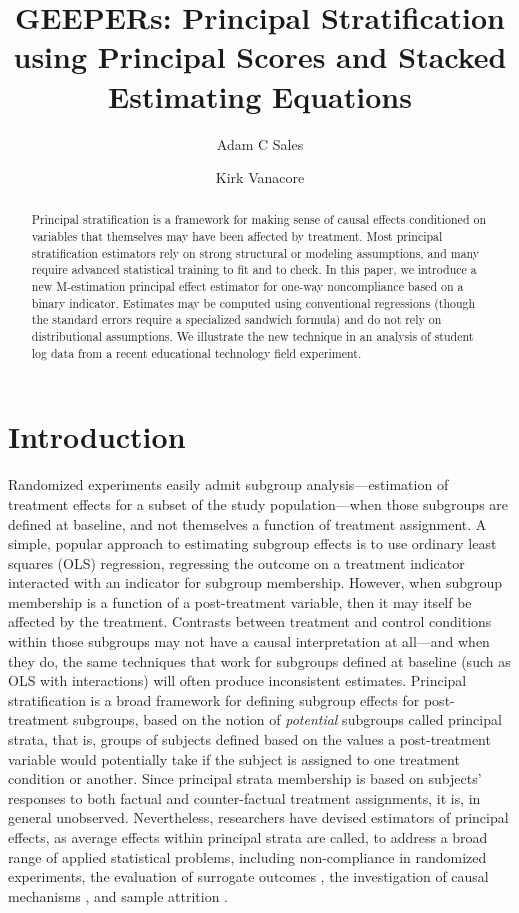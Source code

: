 \documentclass{statsoc} %
\title[GEEPERS]{GEEPERs: Principal Stratification using Principal Scores and Stacked Estimating Equations}
\author[Sales and Vanacore]{Adam C Sales}
\author{Kirk Vanacore}
\begin{document}
\maketitle

\begin{abstract}
Principal stratification is a framework for making sense of causal effects conditioned on variables that themselves may have been affected by treatment. Most principal stratification estimators rely on strong structural or modeling assumptions, and many require advanced statistical training to fit and to check. In this paper, we introduce a new M-estimation principal effect estimator for one-way noncompliance based on a binary indicator. Estimates may be computed using conventional regressions (though the standard errors require a specialized sandwich formula) and do not rely on distributional assumptions. We illustrate the new technique in an analysis of student log data from a recent educational technology field experiment.  
\end{abstract}

\section{Introduction}

Randomized experiments easily admit subgroup analysis---estimation of treatment effects for a subset of the study population---when those subgroups are defined at baseline, and not themselves a function of treatment assignment.
A simple, popular approach to estimating subgroup effects is to use ordinary least squares (OLS) regression, regressing the outcome on a treatment indicator interacted with an indicator for subgroup membership.
However, when subgroup membership is a function of a post-treatment variable, then it may itself be affected by the treatment.
Contrasts between treatment and control conditions within those subgroups may not have a causal interpretation at all---and when they do, the same techniques that work for subgroups defined at baseline (such as OLS with interactions) will often produce inconsistent estimates.
Principal stratification \citep{frangakis} is a broad framework for defining subgroup effects for post-treatment subgroups, based on the notion of \emph{potential} subgroups called principal strata, that is, groups of subjects defined based on the values a post-treatment variable would potentially take if the subject is assigned to one treatment condition or another.
Since principal strata membership is based on subjects' responses to both factual and counter-factual treatment assignments, it is, in general unobserved.
Nevertheless, researchers have devised estimators of principal effects, as average effects within principal strata are called, to address a broad range of applied statistical problems, including non-compliance in randomized experiments, the evaluation of surrogate outcomes \citep{li2010bayesian}, the investigation of causal mechanisms \citep{lidsayPage}, and sample attrition \citep{zhangRubin, ding2011}.
\end{document}
